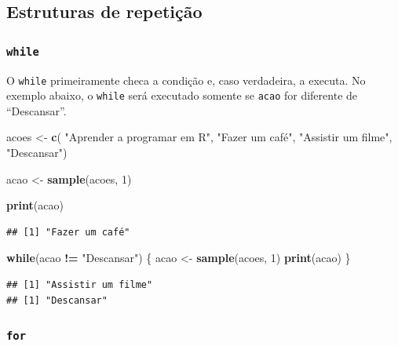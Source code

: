 \documentclass[
]{book}
\newenvironment{Shaded}{\begin{snugshade}}{\end{snugshade}}
\newcommand{\ControlFlowTok}[1]{\textcolor[rgb]{0.13,0.29,0.53}{\textbf{#1}}}
\newcommand{\DecValTok}[1]{\textcolor[rgb]{0.00,0.00,0.81}{#1}}
\newcommand{\FunctionTok}[1]{\textcolor[rgb]{0.13,0.29,0.53}{\textbf{#1}}}
\newcommand{\NormalTok}[1]{#1}
\newcommand{\OtherTok}[1]{\textcolor[rgb]{0.56,0.35,0.01}{#1}}
\newcommand{\SpecialCharTok}[1]{\textcolor[rgb]{0.81,0.36,0.00}{\textbf{#1}}}
\newcommand{\StringTok}[1]{\textcolor[rgb]{0.31,0.60,0.02}{#1}}
\begin{document}
\subsection{Estruturas de repetição}\label{estruturas-de-repetiuxe7uxe3o}

\subsubsection{\texorpdfstring{\texttt{while}}{while}}\label{while}

O \texttt{while} primeiramente checa a condição e, caso verdadeira, a executa.
No exemplo abaixo, o \texttt{while} será executado somente se \texttt{acao} for diferente de ``Descansar''.

\begin{Shaded}
\begin{Highlighting}[]
\NormalTok{acoes }\OtherTok{\textless{}{-}} \FunctionTok{c}\NormalTok{( }\StringTok{"Aprender a programar em R"}\NormalTok{,}
        \StringTok{"Fazer um café"}\NormalTok{,}
        \StringTok{"Assistir um filme"}\NormalTok{,}
        \StringTok{"Descansar"}\NormalTok{)}

\NormalTok{acao }\OtherTok{\textless{}{-}} \FunctionTok{sample}\NormalTok{(acoes, }\DecValTok{1}\NormalTok{)}

\FunctionTok{print}\NormalTok{(acao)}
\end{Highlighting}
\end{Shaded}

\begin{verbatim}
## [1] "Fazer um café"
\end{verbatim}

\begin{Shaded}
\begin{Highlighting}[]
\ControlFlowTok{while}\NormalTok{(acao }\SpecialCharTok{!=} \StringTok{"Descansar"}\NormalTok{) \{}
\NormalTok{  acao }\OtherTok{\textless{}{-}} \FunctionTok{sample}\NormalTok{(acoes, }\DecValTok{1}\NormalTok{)}
  \FunctionTok{print}\NormalTok{(acao)}
\NormalTok{\}}
\end{Highlighting}
\end{Shaded}

\begin{verbatim}
## [1] "Assistir um filme"
## [1] "Descansar"
\end{verbatim}

\subsubsection{\texorpdfstring{\texttt{for}}{for}}\label{for}
\end{document}
